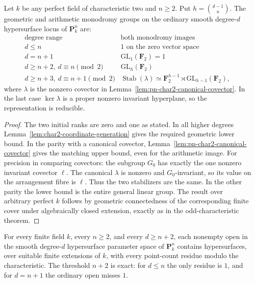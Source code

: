 \begin{theorem}\label{thm:pn-char2-all-groups}
Let $k$ be any perfect field of characteristic two and
$n\geq2$.  Put $h=\binom{d-1}{n}$.  The geometric and
arithmetic monodromy groups on the ordinary smooth
degree-$d$ hypersurface locus of $\mathbf P^n_k$ are:
\[
 \begin{array}{c|c}
 \text{degree range}&\text{both monodromy images}\\ \hline
 d\leq n&1\text{ on the zero vector space}\\
 d=n+1&\mathrm{GL}_1(\mathbf F_2)=1\\
 d\geq n+2,\ d\equiv n\pmod2&\mathrm{GL}_h(\mathbf F_2)\\
 d\geq n+3,\ d\equiv n+1\pmod2&
    \operatorname{Stab}(\lambda)
       \simeq\mathbf F_2^{h-1}\rtimes
                         \mathrm{GL}_{h-1}(\mathbf F_2),
 \end{array}
\]
where $\lambda$ is the nonzero covector in
Lemma~\ref{lem:pn-char2-canonical-covector}.
In the last case $\ker\lambda$ is a proper nonzero invariant
hyperplane, so the representation is reducible.
\end{theorem}

\begin{proof}
The two initial ranks are zero and one as stated.
In all higher degrees
Lemma~\ref{lem:char2-coordinate-generation} gives the required
geometric lower bound.  In the parity with a canonical
covector, Lemma~\ref{lem:pn-char2-canonical-covector} gives
the matching upper bound, even for the arithmetic image.
For precision in comparing covectors: the subgroup $G_0$
has exactly the one nonzero invariant covector $\ell$.
The canonical $\lambda$ is nonzero and $G_0$-invariant,
so its value on the arrangement fibre is $\ell$.
Thus the two stabilizers are the same.
In the other parity the lower bound is the entire general
linear group.  The result over arbitrary perfect $k$
follows by geometric connectedness of the corresponding
finite cover under algebraically closed extension, exactly
as in the odd-characteristic theorem.
\end{proof}

\begin{corollary}\label{cor:pn-all-p-sharp-residue-threshold}
For every finite field $k$, every $n\geq2$, and every
$d\geq n+2$, each nonempty open in the smooth degree-$d$
hypersurface parameter space of $\mathbf P^n_k$ contains
hypersurfaces, over suitable finite extensions of $k$,
with every point-count residue modulo the characteristic.
The threshold $n+2$ is exact: for $d\leq n$ the only
residue is $1$, and for $d=n+1$ the ordinary open misses $1$.
\end{corollary}

